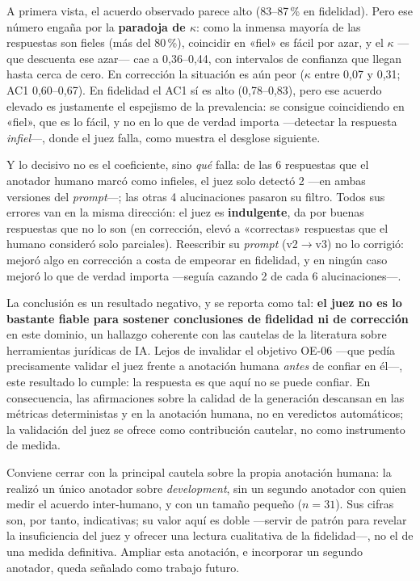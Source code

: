 A primera vista, el acuerdo observado parece alto (83--87\,\% en fidelidad). Pero ese número engaña por la \textbf{paradoja de $\kappa$}: como la inmensa mayoría de las respuestas son fieles (más del 80\,\%), coincidir en «fiel» es fácil por azar, y el $\kappa$ —que descuenta ese azar— cae a 0,36--0,44, con intervalos de confianza que llegan hasta cerca de cero. En corrección la situación es aún peor ($\kappa$ entre 0,07 y 0,31; AC1 0,60--0,67). En fidelidad el AC1 sí es alto (0,78--0,83), pero ese acuerdo elevado es justamente el espejismo de la prevalencia: se consigue coincidiendo en «fiel», que es lo fácil, y no en lo que de verdad importa —detectar la respuesta \emph{infiel}—, donde el juez falla, como muestra el desglose siguiente.

Y lo decisivo no es el coeficiente, sino \emph{qué} falla: de las 6 respuestas que el anotador humano marcó como infieles, el juez solo detectó 2 —en ambas versiones del \emph{prompt}—; las otras 4 alucinaciones pasaron su filtro. Todos sus errores van en la misma dirección: el juez es \textbf{indulgente}, da por buenas respuestas que no lo son (en corrección, elevó a «correctas» respuestas que el humano consideró solo parciales). Reescribir su \emph{prompt} (v2$\rightarrow$v3) no lo corrigió: mejoró algo en corrección a costa de empeorar en fidelidad, y en ningún caso mejoró lo que de verdad importa —seguía cazando 2 de cada 6 alucinaciones—.

La conclusión es un resultado negativo, y se reporta como tal: \textbf{el juez no es lo bastante fiable para sostener conclusiones de fidelidad ni de corrección} en este dominio, un hallazgo coherente con las cautelas de la literatura sobre herramientas jurídicas de IA. Lejos de invalidar el objetivo OE-06 —que pedía precisamente validar el juez frente a anotación humana \emph{antes} de confiar en él—, este resultado lo cumple: la respuesta es que aquí no se puede confiar. En consecuencia, las afirmaciones sobre la calidad de la generación descansan en las métricas deterministas y en la anotación humana, no en veredictos automáticos; la validación del juez se ofrece como contribución cautelar, no como instrumento de medida.

Conviene cerrar con la principal cautela sobre la propia anotación humana: la realizó un único anotador sobre \emph{development}, sin un segundo anotador con quien medir el acuerdo inter-humano, y con un tamaño pequeño ($n=31$). Sus cifras son, por tanto, indicativas; su valor aquí es doble —servir de patrón para revelar la insuficiencia del juez y ofrecer una lectura cualitativa de la fidelidad—, no el de una medida definitiva. Ampliar esta anotación, e incorporar un segundo anotador, queda señalado como trabajo futuro.

